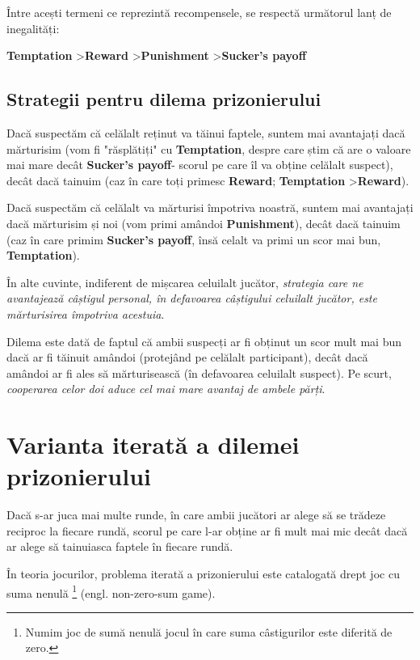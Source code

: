 Între acești termeni ce reprezintă recompensele, se respectă următorul lanț de inegalități: 

\begin{center} 
	\textbf{Temptation} \textgreater \textbf{Reward} \textgreater \textbf{Punishment} \textgreater \textbf{Sucker's payoff} 
\end{center} 

\subsection{Strategii pentru dilema prizonierului}

Dacă suspectăm că celălalt reținut va tăinui faptele, suntem mai avantajați dacă mărturisim (vom fi "răsplătiți" cu \textbf{Temptation}, despre care știm că are o valoare mai mare decât \textbf{Sucker's payoff}- scorul pe care îl va obține celălalt suspect), decât dacă tainuim (caz în care toți primesc \textbf{Reward}; \textbf{Temptation} \textgreater \textbf{Reward}).

Dacă suspectăm că celălalt va mărturisi împotriva noastră, suntem mai avantajați dacă mărturisim și noi (vom primi amândoi \textbf{Punishment}), decât dacă tainuim (caz în care primim \textbf{Sucker's payoff}, însă celalt va primi un scor mai bun, \textbf{Temptation}).

În alte cuvinte, indiferent de mișcarea celuilalt jucător, \textit{strategia care ne avantajează câștigul personal, în defavoarea câștigului celuilalt jucător, este mărturisirea împotriva acestuia}.

Dilema este dată de faptul că ambii suspecți ar fi obținut un scor mult mai bun dacă ar fi tăinuit amândoi (protejând pe celălalt participant), decât dacă amândoi ar fi ales să mărturisească (în defavoarea celuilalt suspect). Pe scurt, \textit{cooperarea celor doi aduce cel mai mare avantaj de ambele părți}.

\section {Varianta iterată a dilemei prizonierului} 

Dacă s-ar juca mai multe runde, în care ambii jucători ar alege să se trădeze reciproc la fiecare rundă, scorul pe care l-ar obține ar fi mult mai mic decât dacă ar alege să tainuiasca faptele în fiecare rundă. 

În teoria jocurilor, problema iterată a prizonierului este catalogată drept joc cu suma nenulă \footnote{Numim joc de sumă nenulă jocul în care suma câstigurilor este diferită de zero.} (engl. non-zero-sum game).


